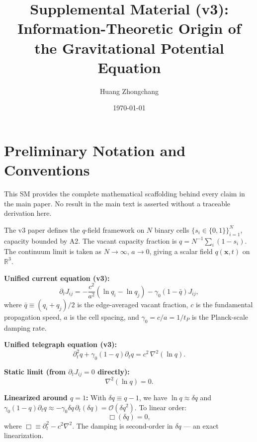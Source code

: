\documentclass[reprint]{revtex4-2}
\begin{document}
\title{Supplemental Material (v3):\\
Information-Theoretic Origin of the Gravitational Potential Equation}

\author{Huang Zhongchang}

\date{\today}

\maketitle
\tableofcontents

\section{Preliminary Notation and Conventions}

This SM provides the complete mathematical scaffolding behind every claim in the main paper. No result in the main text is asserted without a traceable derivation here.

The v3 paper defines the $q$-field framework on $N$ binary cells $\{s_i\in\{0,1\}\}_{i=1}^N$, capacity bounded by A2. The vacant capacity fraction is $q=N^{-1}\sum_i(1-s_i)$. The continuum limit is taken as $N\to\infty$, $a\to0$, giving a scalar field $q(\mathbf{x},t)$ on $\mathbb{R}^3$.

\textbf{Unified current equation (v3):}
\begin{equation}
\partial_t J_{ij} = -\frac{c^2}{a^2}(\ln q_i - \ln q_j) - \gamma_0(1-\bar{q})J_{ij},
\label{eq:unified_current}
\end{equation}
where $\bar{q} \equiv (q_i+q_j)/2$ is the edge-averaged vacant fraction, $c$ is the fundamental propagation speed, $a$ is the cell spacing, and $\gamma_0 = c/a = 1/t_P$ is the Planck-scale damping rate.

\textbf{Unified telegraph equation (v3):}
\begin{equation}
\boxed{\partial_t^2 q + \gamma_0(1-q)\partial_t q = c^2\,\nabla^2(\ln q)}.
\label{eq:unified_telegraph}
\end{equation}

\textbf{Static limit (from $\partial_t J_{ij}=0$ directly):}
\begin{equation}
\boxed{\nabla^2(\ln q) = 0}.
\label{eq:static_limit}
\end{equation}

\textbf{Linearized around $q=1$:} With $\delta q \equiv q-1$, we have $\ln q \approx \delta q$ and $\gamma_0(1-q)\partial_t q \approx -\gamma_0\delta q\,\partial_t(\delta q) = \mathcal{O}(\delta q^2)$. To linear order:
\begin{equation}
\boxed{\Box(\delta q) = 0},
\label{eq:linearized_exact}
\end{equation}
where $\Box \equiv \partial_t^2 - c^2\nabla^2$. The damping is second-order in $\delta q$ --- an exact linearization.
\end{document}
